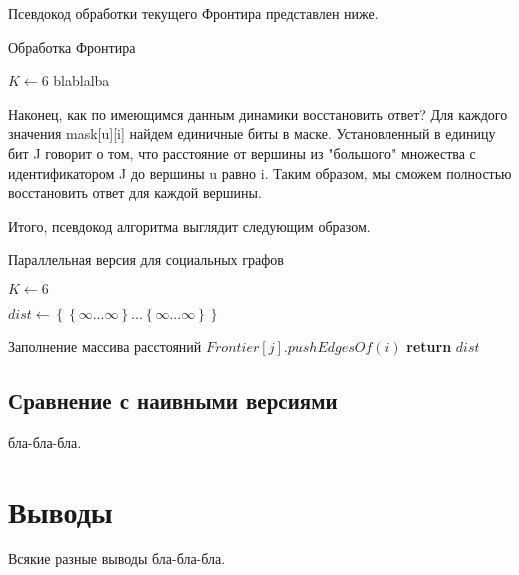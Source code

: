 Псевдокод обработки текущего Фронтира представлен ниже. 
\begin{algorithm}
\caption{Обработка Фронтира}\label{all_pairs_social3}
\begin{algorithmic}[1]
\State $ K \gets 6$
\State
{}
\State blablalba
\EndProcedure
\end{algorithmic}
\end{algorithm}


\FloatBarrier
Наконец, как по имеющимся данным динамики восстановить ответ? Для каждого значения mask[u][i] найдем единичные биты в маске. Установленный в единицу бит J говорит о том, что расстояние от вершины из "большого" множества с идентификатором J до вершины u равно i. Таким образом, мы сможем полностью восстановить ответ для каждой вершины. 


Итого, псевдокод алгоритма выглядит следующим образом.

\FloatBarrier
\begin{algorithm}
\caption{Параллельная версия для социальных графов}\label{all_pairs_social}
\begin{algorithmic}[1]
\State $ K \gets 6$
\State

\State $dist\gets \left\{ {   \left\{ {\infty ... \infty}\right\}  ... \left\{ {\infty ... \infty}\right\} }\right\}$


\State Заполнение массива расстояний
\algrenewcommand{}
\algrenewcommand{}
		\State $Frontier[j].pushEdgesOf(i)$
	\EndFor
\EndFor 
\State \textbf{return} $dist$ 
\EndProcedure

\end{algorithmic}
\end{algorithm}


\FloatBarrier
\subsection{Сравнение с наивными версиями}
бла-бла-бла.

\FloatBarrier
\section{Выводы}
Всякие разные выводы бла-бла-бла.

\FloatBarrier
